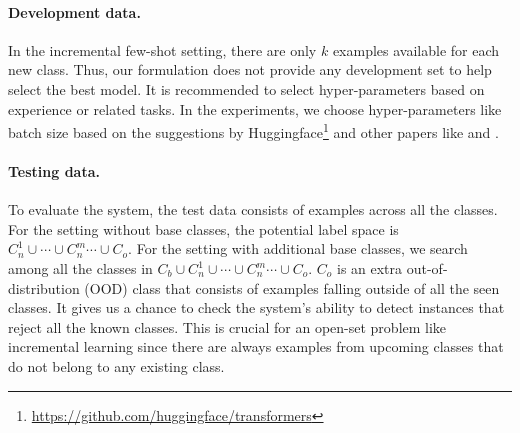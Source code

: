 \documentclass[11pt]{article}
\begin{document}




\paragraph{Development data.} 
In the incremental few-shot setting, there are only $k$ examples available for each new class. Thus, our formulation does not provide any development set to help select the best model. It is recommended to select hyper-parameters based on experience or related tasks. In the experiments, we choose hyper-parameters like batch size based on the suggestions by Huggingface\footnote{\url{https://github.com/huggingface/transformers}} and other papers like \citet{devlin2018bert} and \citet{zhangdiscriminative}.



\paragraph{Testing data.}
To evaluate the system, the test data consists of examples across all the classes. For the setting without base classes, the potential label space is $C_{n}^1 \cup \cdots \cup C_{n}^m \cdots \cup C_o$. For the setting with additional base classes, we search among all the classes in $C_b\cup C_{n}^1 \cup \cdots \cup C_{n}^m \cdots \cup C_o$. $C_o$ is an extra out-of-distribution (OOD) class that consists of examples falling outside of all the seen classes. It gives us a chance to check the system's ability to detect instances that reject all the known classes. This is crucial for an open-set problem like incremental learning since there are always examples from upcoming classes that do not belong to any existing class.
\end{document}
